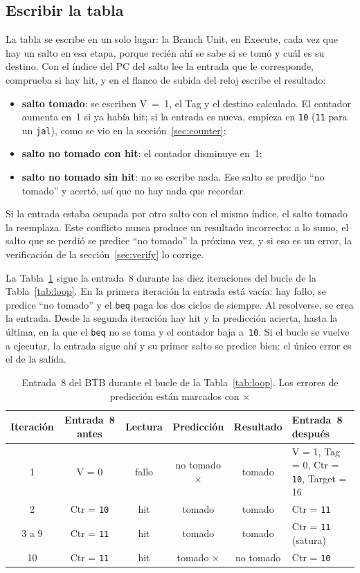 \documentclass[11pt,a4paper]{article}
\newcommand{\ins}[1]{\texttt{#1}}
\begin{document}
\subsection{Escribir la tabla}

La tabla se escribe en un solo lugar: la Branch Unit, en Execute, cada vez que hay un salto
en esa etapa, porque recién ahí se sabe si se tomó y cuál es su destino. Con el índice del
PC del salto lee la entrada que le corresponde, comprueba si hay hit, y en el flanco de
subida del reloj escribe el resultado:
\begin{itemize}
  \item \textbf{salto tomado}: se escriben V~=~1, el Tag y el destino calculado. El contador
        aumenta en~1 si ya había hit; si la entrada es nueva, empieza en \texttt{10}
        (\texttt{11} para un \ins{jal}), como se vio en la sección~\ref{sec:counter};
  \item \textbf{salto no tomado con hit}: el contador disminuye en~1;
  \item \textbf{salto no tomado sin hit}: no se escribe nada. Ese salto se predijo ``no
        tomado'' y acertó, así que no hay nada que recordar.
\end{itemize}
Si la entrada estaba ocupada por otro salto con el mismo índice, el salto tomado la
reemplaza. Este conflicto nunca produce un resultado incorrecto: a lo sumo, el salto que se
perdió se predice ``no tomado'' la próxima vez, y si eso es un error, la verificación de la
sección~\ref{sec:verify} lo corrige.

La Tabla~\ref{tab:trace} sigue la entrada~8 durante las diez iteraciones del bucle de la
Tabla~\ref{tab:loop}. En la primera iteración la entrada está vacía: hay fallo, se predice
``no tomado'' y el \ins{beq} paga los dos ciclos de siempre. Al resolverse, se crea la
entrada. Desde la segunda iteración hay hit y la predicción acierta, hasta la última, en la
que el \ins{beq} no se toma y el contador baja a~\texttt{10}. Si el bucle se vuelve a
ejecutar, la entrada sigue ahí y su primer salto se predice bien: el único error es el de la
salida.

\begin{table}[htbp]
\centering\small
\caption{Entrada~8 del BTB durante el bucle de la Tabla~\ref{tab:loop}. Los errores de
predicción están marcados con $\times$}
\label{tab:trace}
\begin{tabular}{@{}cccc c>{\raggedright\arraybackslash}p{3.9cm}@{}}
\toprule
Iteración & Entrada~8 antes & Lectura & Predicción & Resultado & Entrada~8 después \\
\midrule
1        & V = 0              & fallo & no tomado $\times$ & tomado    & V = 1, Tag = 0, Ctr = \texttt{10}, Target = 16 \\
2        & Ctr = \texttt{10}  & hit   & tomado             & tomado    & Ctr = \texttt{11} \\
3 a 9    & Ctr = \texttt{11}  & hit   & tomado             & tomado    & Ctr = \texttt{11} (satura) \\
10       & Ctr = \texttt{11}  & hit   & tomado $\times$    & no tomado & Ctr = \texttt{10} \\
\bottomrule
\end{tabular}
\end{table}
\end{document}
